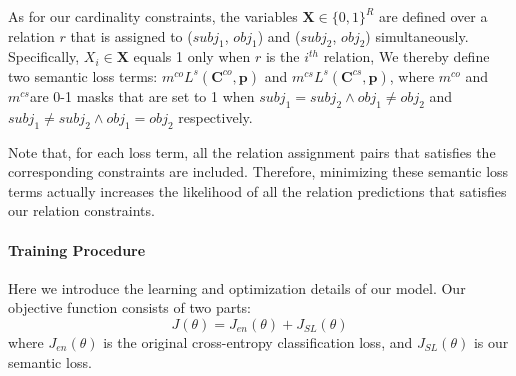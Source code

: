 As for our cardinality constraints, the variables $\bm{X}\in \{0,1\}^{R}$ are defined over a relation $r$ that is assigned to ($subj_1$, $obj_1$) and ($subj_2$, $obj_2$) simultaneously.
Specifically, $X_i\in \bm{X}$ equals 1 only when $r$ is the $i^{th}$ relation,
We thereby define two semantic loss terms: $m^{co}L^{s}(\bm{C}^{co}, \bm{p})$ and $m^{cs}L^{s}(\bm{C}^{cs}, \bm{p})$, where $m^{co}$ and $m^{cs}$are 0-1 masks that are set to 1 when $subj_1=subj_2 \land obj_1\neq obj_2$ and $subj_1\neq subj_2 \land obj_1=obj_2$ respectively.

Note that, for each loss term, all the relation assignment pairs that satisfies the corresponding constraints are included.
Therefore, minimizing these semantic loss terms actually increases the likelihood of all the relation predictions that satisfies our relation constraints.
\fi


\paragraph{Training Procedure}
Here we introduce the learning and optimization details of our model. Our objective function consists of two parts:
\begin{equation}
	J(\theta) = J_{en}(\theta) + J_{SL}(\theta)
\end{equation}
where  $J_{en}(\theta)$ is the original cross-entropy classification loss, and $J_{SL}(\theta)$ is our semantic loss.


